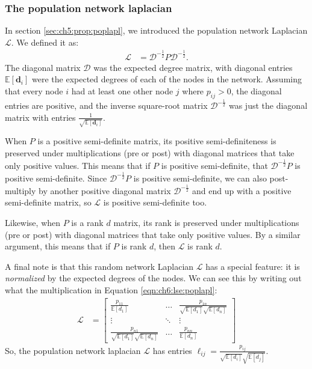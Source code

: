 \subsubsection{The population network laplacian}
\label{sec:ch6:lse:props}

In section \ref{sec:ch5:prop:poplapl}, we introduced the population network Laplacian $\mathcal L$. We defined it as:
\begin{align*}
    \mathcal L &= \mathcal D^{-\frac{1}{2}}P \mathcal D^{-\frac{1}{2}}.
\end{align*}
The diagonal matrix $\mathcal D$ was the expected degree matrix, with diagonal entries $\mathbb E[\mathbf d_i]$ were the expected degrees of each of the nodes in the network. Assuming that every node $i$ had at least one other node $j$ where $p_{ij} > 0$, the diagonal entries are positive, and the inverse square-root matrix $\mathcal D^{-\frac{1}{2}}$ was just the diagonal matrix with entries $\frac{1}{\sqrt{\mathbb E[\mathbf d_i]}}$.

When $P$ is a positive semi-definite matrix, its positive semi-definiteness is preserved under multiplications (pre or post) with diagonal matrices that take only positive values. This means that if $P$ is positive semi-definite, that $\mathcal D^{-\frac{1}{2}}P$ is positive semi-definite. Since $\mathcal D^{-\frac{1}{2}}P$ is positive semi-definite, we can also post-multiply by another positive diagonal matrix $\mathcal D^{-\frac{1}{2}}$ and end up with a positive semi-definite matrix, so $\mathcal L$ is positive semi-definite too. 

Likewise, when $P$ is a rank $d$ matrix, its rank is preserved under multiplications (pre or post) with diagonal matrices that take only positive values. By a similar argument, this means that if $P$ is rank $d$, then $\mathcal L$ is rank $d$.

A final note is that this random network Laplacian $\mathcal L$ has a special feature: it is \textit{normalized} by the expected degrees of the nodes. We can see this by writing out what the multiplication in Equation \eqref{eqn:ch6:lse:poplapl}:
\begin{align*}
    \mathcal L &= \begin{bmatrix}
        \frac{p_{11}}{\mathbb E[d_1]} & \hdots & \frac{p_{1n}}{\sqrt{\mathbb E[d_1]} \sqrt{\mathbb E[d_n]}} \\
        \vdots & \ddots & \vdots \\
        \frac{p_{n1}}{\sqrt{\mathbb E[d_1]} \sqrt{\mathbb E[d_n]}}  & \hdots & \frac{p_{nn}}{\mathbb E[d_n]} 
    \end{bmatrix}
\end{align*}
So, the population network laplacian $\mathcal L$ has entries $\ell_{ij} = \frac{p_{ij}}{\sqrt{\mathbb E[d_i]}\sqrt{\mathbb E[d_j]}}$.

